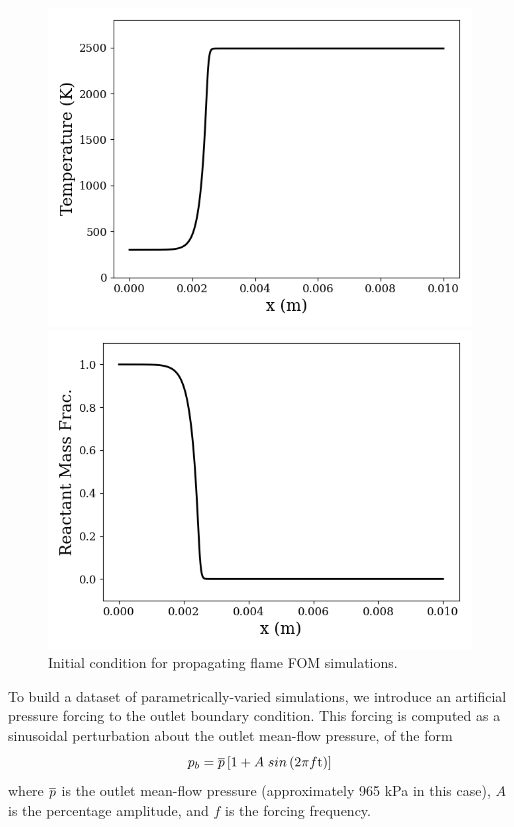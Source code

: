\begin{figure}
	\begin{minipage}{0.49\linewidth}
		\includegraphics[width=0.99\linewidth]{Chapters/TransientFlame/Images/init_cond_temp.png}
	\end{minipage}
	\begin{minipage}{0.49\linewidth}
		\includegraphics[width=0.99\linewidth]{Chapters/TransientFlame/Images/init_cond_mf.png}
	\end{minipage}
	\caption{\label{fig:flameIC}Initial condition for propagating flame FOM simulations.}
\end{figure}

To build a dataset of parametrically-varied simulations, we introduce an artificial pressure forcing to the outlet boundary condition. This forcing is computed as a sinusoidal perturbation about the outlet mean-flow pressure, of the form
%
\begin{equation}
	p_b = \overline{p} \left[1 + A \; sin\left(2 \pi f \text{t}\right)\right]
\end{equation}
%
where $\overline{p}$ is the outlet mean-flow pressure (approximately 965 kPa in this case), $A$ is the percentage amplitude, and $f$ is the forcing frequency.